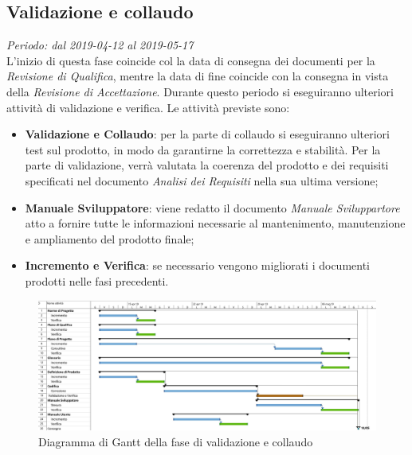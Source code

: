 \subsection{Validazione e collaudo}
\textit{Periodo: dal 2019-04-12 al 2019-05-17 } \\
L'inizio di questa fase coincide col la data di consegna dei documenti per la 
\textit{Revisione di Qualifica}, mentre la data di fine coincide con la 
consegna in vista della \textit{Revisione di Accettazione}. Durante questo periodo 
si eseguiranno ulteriori attività di validazione e verifica. Le attività 
previste sono: 
\begin{itemize}
	\item \textbf{Validazione e Collaudo}: per la parte di collaudo si 
	eseguiranno ulteriori test sul prodotto, in modo da garantirne la 
	correttezza e stabilità. Per la parte di validazione, verrà 
	valutata la coerenza del prodotto e dei requisiti specificati nel documento 
	\textit{Analisi dei Requisiti} nella sua ultima versione;
	\item \textbf{Manuale Sviluppatore}: viene redatto il documento \textit{Manuale Sviluppartore} atto a fornire tutte le informazioni necessarie al mantenimento, manutenzione e ampliamento del prodotto finale;
	\item \textbf{Incremento e Verifica}: se necessario vengono migliorati i 
	documenti prodotti nelle fasi precedenti.
\end{itemize}
\begin{figure}[H]
	\includegraphics[width=0.99\linewidth]{res/images/gantt_val.jpg}
	\caption{Diagramma di Gantt della fase di validazione e collaudo}
\end{figure}